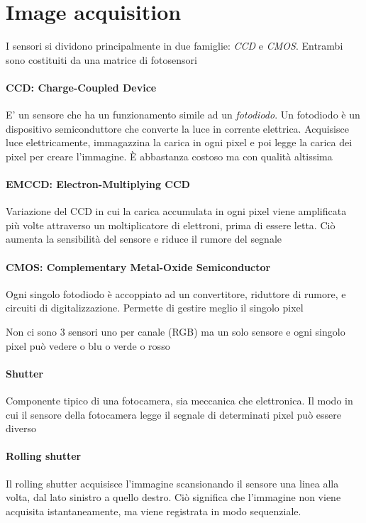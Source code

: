 \section{Image acquisition}
I sensori si dividono principalmente in due famiglie: \textit{CCD} e \textit{CMOS}. Entrambi sono costituiti da una matrice di fotosensori

\paragraph{CCD: Charge-Coupled Device}
E' un sensore che ha un funzionamento simile ad un \textit{fotodiodo}. Un fotodiodo è un dispositivo semiconduttore che converte la luce in corrente elettrica. Acquisisce luce elettricamente, immagazzina la carica in ogni pixel e poi legge la carica dei pixel per creare l'immagine. È abbastanza costoso ma con qualità altissima

\paragraph{EMCCD: Electron-Multiplying CCD}
Variazione del CCD in cui la carica accumulata in ogni pixel viene amplificata più volte attraverso un moltiplicatore di elettroni, prima di essere letta. Ciò aumenta la sensibilità del sensore e riduce il rumore del segnale

\paragraph{CMOS: Complementary Metal-Oxide Semiconductor}
Ogni singolo fotodiodo è accoppiato ad un convertitore, riduttore di rumore, e circuiti di digitalizzazione. Permette di gestire meglio il singolo pixel

Non ci sono $3$ sensori uno per canale (RGB) ma un solo sensore e ogni singolo pixel può vedere o blu o verde o rosso

\paragraph{Shutter}
Componente tipico di una fotocamera, sia meccanica che elettronica. Il modo in cui il sensore della fotocamera legge il segnale di determinati pixel può essere diverso

\paragraph{Rolling shutter}
Il rolling shutter acquisisce l'immagine scansionando il sensore una linea alla volta, dal lato sinistro a quello destro. Ciò significa che l'immagine non viene acquisita istantaneamente, ma viene registrata in modo sequenziale. 

